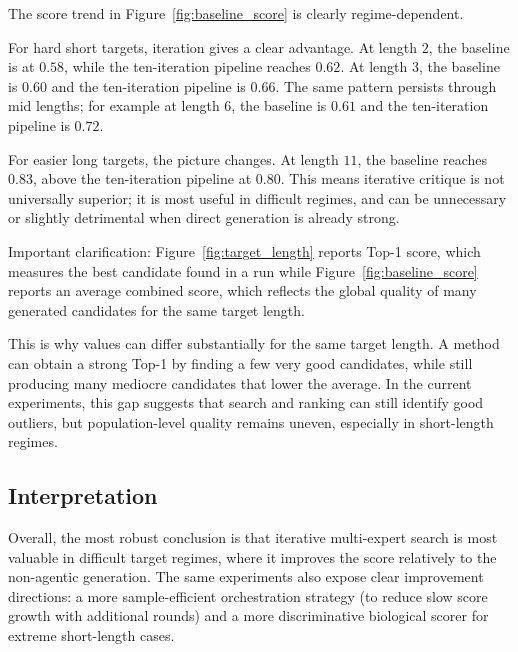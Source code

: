The score trend in Figure~\ref{fig:baseline_score} is clearly regime-dependent.

For hard short targets, iteration gives a clear advantage. At length $2$, the baseline is at $0.58$, while the ten-iteration pipeline reaches $0.62$. At length $3$, the baseline is $0.60$ and the ten-iteration pipeline is $0.66$. The same pattern persists through mid lengths; for example at length $6$, the baseline is $0.61$ and the ten-iteration pipeline is $0.72$.

For easier long targets, the picture changes. At length $11$, the baseline reaches $0.83$, above the ten-iteration pipeline at $0.80$. This means iterative critique is not universally superior; it is most useful in difficult regimes, and can be unnecessary or slightly detrimental when direct generation is already strong.

Important clarification: Figure~\ref{fig:target_length} reports Top-1 score, which measures the best candidate found in a run while Figure~\ref{fig:baseline_score} reports an average combined score, which reflects the global quality of many generated candidates for the same target length.

This is why values can differ substantially for the same target length. A method can obtain a strong Top-1 by finding a few very good candidates, while still producing many mediocre candidates that lower the average. In the current experiments, this gap suggests that search and ranking can still identify good outliers, but population-level quality remains uneven, especially in short-length regimes.

\subsection{Interpretation}\label{subsec:expert_feedback}

Overall, the most robust conclusion is that iterative multi-expert search is most valuable in difficult target regimes, where it improves the score relatively to the non-agentic generation. The same experiments also expose clear improvement directions: a more sample-efficient orchestration strategy (to reduce slow score growth with additional rounds) and a more discriminative biological scorer for extreme short-length cases.
